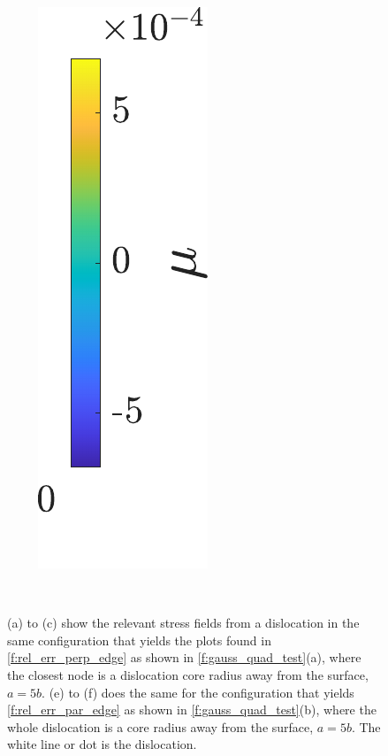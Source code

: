 \documentclass[11pt]{iopart}
\begin{document}
\begin{figure}
    \centering
    ~
    ~
    ~
    \subfloat
    {
        {\includegraphics[height=0.234\linewidth]{images/sxzsyzszzperpEdgeFiveb_leg.pdf}}
    }

    ~
    ~
    \caption{(a) to (c) show the relevant stress fields from a dislocation in the same configuration that yields the plots found in \cref{f:rel_err_perp_edge} as shown in \cref{f:gauss_quad_test}(a), where the closest node is a dislocation core radius away from the surface, $a = 5b$. (e) to (f) does the same for the configuration that yields \cref{f:rel_err_par_edge} as shown in \cref{f:gauss_quad_test}(b), where the whole dislocation is a core radius away from the surface, $a = 5b$. The white line or dot is the dislocation.}
    \label{f:sigma_edge_test_config}
\end{figure}
\end{document}
